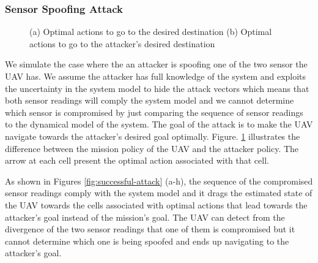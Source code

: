 \documentclass[letterpaper, 10 pt, conference]{ieeeconf}  %
\begin{document}
\subsubsection{Sensor Spoofing Attack}
\begin{figure}[]
	\centering
	\caption{(a) Optimal actions to go to the desired destination (b) Optimal actions to go to the attacker's desired destination}
	\label{fig:policies}
\end{figure}
We simulate the case where the an attacker is spoofing one of the two sensor the UAV has. We assume the attacker has full knowledge of the system and exploits the uncertainty in the system model to hide the attack vectors which means that both sensor readings will comply the system model and we cannot determine which sensor is compromised by just comparing the sequence of sensor readings to the dynamical model of the system. The goal of the attack is to make the UAV navigate towards the attacker's desired goal optimally. Figure. \ref{fig:policies} illustrates the difference between the mission policy of the UAV and the attacker policy. The arrow at each cell present the optimal action associated with that cell.

As shown in Figures \ref{fig:successful-attack} (a-h), the sequence of the compromised sensor readings comply with the system model and it drags the estimated state of the UAV towards the cells associated with optimal actions that lead towards the attacker's goal instead of the mission's goal. The UAV can detect from the divergence of the two sensor readings that one of them is compromised but it cannot determine which one is being spoofed and ends up navigating to the attacker's goal.
\end{document}
